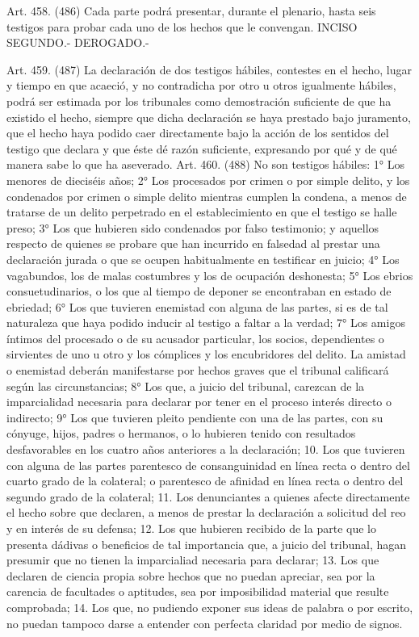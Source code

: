     Art. 458. (486) Cada parte podrá presentar, durante el plenario, hasta seis testigos para probar cada uno de los hechos que le convengan.
    INCISO SEGUNDO.- DEROGADO.-


    Art. 459. (487) La declaración de dos testigos hábiles, contestes en el hecho, lugar y tiempo en que acaeció, y no contradicha por otro u otros igualmente hábiles, podrá ser estimada por los tribunales como demostración suficiente de que ha existido el hecho, siempre que dicha declaración se haya prestado bajo juramento, que el hecho haya podido caer directamente bajo la acción de los sentidos del testigo que declara y que éste dé razón suficiente, expresando por qué y de qué manera sabe lo que ha aseverado.
    Art. 460. (488) No son testigos hábiles:
    1° Los menores de dieciséis años;
    2° Los procesados por crimen o por simple delito, y los condenados por crimen o simple delito mientras cumplen la condena, a menos de tratarse de un delito perpetrado en el establecimiento en que el testigo se halle preso;
    3° Los que hubieren sido condenados por falso testimonio; y aquellos respecto de quienes se probare que han incurrido en falsedad al prestar una declaración jurada o que se ocupen habitualmente en testificar en juicio;
    4° Los vagabundos, los de malas costumbres y los de ocupación deshonesta;
    5° Los ebrios consuetudinarios, o los que al tiempo de deponer se encontraban en estado de ebriedad;
    6° Los que tuvieren enemistad con alguna de las partes, si es de tal naturaleza que haya podido inducir al testigo a faltar a la verdad;
    7° Los amigos íntimos del procesado o de su acusador particular, los socios, dependientes o sirvientes de uno u otro y los cómplices y los encubridores del delito.
    La amistad o enemistad deberán manifestarse por hechos graves que el tribunal calificará según las circunstancias;
    8° Los que, a juicio del tribunal, carezcan de la imparcialidad necesaria para declarar por tener en el proceso interés directo o indirecto;
    9° Los que tuvieren pleito pendiente con una de las partes, con su cónyuge, hijos, padres o hermanos, o lo hubieren tenido con resultados desfavorables en los cuatro años anteriores a la declaración;
    10. Los que tuvieren con alguna de las partes parentesco de consanguinidad en línea recta o dentro del cuarto grado de la colateral; o parentesco de afinidad en línea recta o dentro del segundo grado de la colateral;
    11. Los denunciantes a quienes afecte directamente el hecho sobre que declaren, a menos de prestar la declaración a solicitud del reo y en interés de su defensa;
    12. Los que hubieren recibido de la parte que lo presenta dádivas o beneficios de tal importancia que, a juicio del tribunal, hagan presumir que no tienen la imparcialiad necesaria para declarar;
    13. Los que declaren de ciencia propia sobre hechos que no puedan apreciar, sea por la carencia de facultades o aptitudes, sea por imposibilidad material que resulte comprobada;
    14. Los que, no pudiendo exponer sus ideas de palabra o por escrito, no puedan tampoco darse a entender con perfecta claridad por medio de signos.






